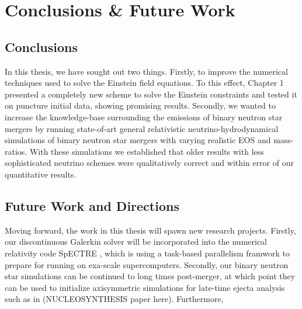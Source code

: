 \chapter{Conclusions \& Future Work}
\label{chap:conc}

\section{Conclusions}

In this thesis, we have sought out two things. Firstly, to improve the numerical techniques used to solve the Einstein field equations. To this effect, Chapter 1 presented a completely new scheme to solve the Einstein constraints and tested it on puncture initial data, showing promising results. Secondly, we wanted to increase the knowledge-base surrounding the emissions of binary neutron star mergers by running state-of-art general relativistic neutrino-hydrodynamical simulations of binary neutron star mergers with varying realistic EOS and mass-ratios. With these simulations we established that older results with less sophisticated neutrino schemes were qualitatively correct and within error of our quantitative results.

\section{Future Work and Directions}

Moving forward, the work in this thesis will spawn new research projects. Firstly, 
our discontinuous Galerkin solver will be incorporated into the numerical relativity code SpECTRE \cite{kidder2016spectre}, which is using a task-based parallelism framwork to prepare for running on exa-scale supercomputers. Secondly, our binary neutron star simulations can be continued to long times post-merger, at which point they can be used to initialize axisymmetric simulations for late-time ejecta analysis such as in (NUCLEOSYNTHESIS paper here). Furthermore, 
